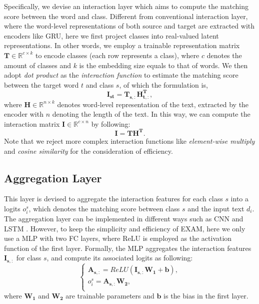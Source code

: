 \documentclass[letterpaper]{article} %
\begin{document}
Specifically, we devise an interaction layer which aims to compute the matching score between the word and class. Different from conventional interaction layer, where the word-level representations of both source and target are extracted with encoders like GRU, here we first project classes into real-valued latent representations. In other words, we employ a trainable representation matrix $\mathbf{T} \in \mathbb{R}^{c\times k}$ to encode classes (each row represents a class), where $c$ denotes the amount of classes and $k$ is the embedding size equals to that of words. 
We then adopt \textit{dot product} as the \textit{interaction function} to estimate the matching score between the target word $t$ and class $s$, of which the formulation is,
%
\begin{equation}
\mathbf{I_{st}} =\mathbf{T_{s,:}} \mathbf{H_{t,:}^{T}},
\end{equation}
where $\mathbf{H} \in \mathbb{R}^{n \times k}$ denotes word-level representation of the text, extracted by the encoder with $n$ denoting the length of the text. 
In this way, we can compute the interaction matrix $\mathbf{I} \in \mathbb{R}^{c\times n}$ by following:
\begin{equation}
\mathbf{I} =\mathbf{T} \mathbf{H^{T}}.
\end{equation}
%
Note that we reject more complex interaction functions like \textit{element-wise multiply} \cite{diin} and \textit{cosine similarity} \cite{BIMPM} for the consideration of efficiency.

\subsection{Aggregation Layer}
This layer is devised to aggregate the interaction features for each class $s$ into a logits $o_i^s$, which denotes the matching score between class $s$ and the input text $d_i$. The aggregation layer can be implemented in different ways such as CNN \cite{diin} and LSTM \cite{BIMPM}. However, to keep the simplicity and efficiency of EXAM, here we only use a MLP with two FC layers, where ReLU is employed as the activation function of the first layer. Formally, the MLP aggregates the interaction features $\mathbf{I_{s,:}}$ for class $s$, and compute its associated logits as following:
\begin{equation}
\left\{
\begin{array}{lr}
\mathbf{A_{s,:}} = ReLU(\mathbf{I_{s,:}} \mathbf{W_{1}} + \mathbf{b}),\\
o_i^{s} = \mathbf{A_{s,:}} \mathbf{W_{2}},\\
\end{array}
\right.
\end{equation}
where $\mathbf{W_{1}}$ and $\mathbf{W_{2}}$ are trainable parameters and $\mathbf{b}$ is the bias in the first layer.
\end{document}
